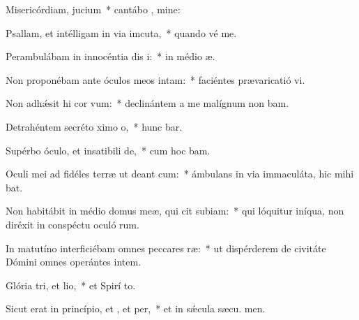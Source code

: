 \item Misericórdiam,  jucium~* cantábo , mine:
\item Psallam, et intélligam in via imcuta,~* quando vé  me.
\item Perambulábam in innocéntia dis i:~* in médio  æ.
\item Non proponébam ante óculos meos  intam:~* faciéntes prævaricatió vi.
\item Non adhǽsit hi cor vum:~* declinántem a me malígnum non bam.
\item Detrahéntem secréto ximo o,~* hunc bar.
\item Supérbo óculo, et insatibili de,~* cum hoc  bam.
\item Oculi mei ad fidéles terræ ut deant cum:~* ámbulans in via immaculáta, hic mihi bat.
\item Non habitábit in médio domus meæ, qui cit subiam:~* qui lóquitur iníqua, non diréxit in conspéctu oculó rum.
\item In matutíno interficiébam omnes peccares ræ:~* ut dispérderem de civitáte Dómini omnes operántes intem.
\item Glória tri, et lio,~* et Spirí to.
\item Sicut erat in princípio, et , et per,~* et in sǽcula sæcu. men.
